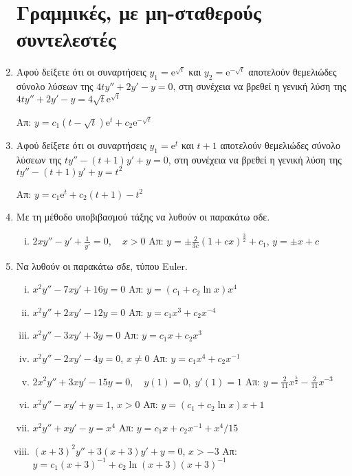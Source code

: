 \begin{enumerate}
  \section*{Γραμμικές, με μη-σταθερούς συντελεστές}

\item Αφού δείξετε ότι οι συναρτήσεις $ y_{1} = \mathrm{e}^{\sqrt{t}} $ και $ y_{2}= 
  \mathrm{e}^{- \sqrt{t}}$ αποτελούν θεμελιώδες σύνολο λύσεων της $ 4ty'' +2y'-y=0 $, 
  στη συνέχεια να βρεθεί η γενική λύση της 
  $ 4ty''+2y'-y=4 \sqrt{t} \mathrm{e}^{\sqrt{t}} $

  \hfill Απ: $ y= c_{1}(t- \sqrt{t}) \mathrm{e}^{t} + c_{2} \mathrm{e}^{- \sqrt{t}} $ 

\item Αφού δείξετε ότι οι συναρτήσεις $ y_{1} = \mathrm{e}^{t} $ και $t+1$ αποτελούν 
  θεμελιώδες σύνολο λύσεων της $ty''-(t+1)y'+y=0$, 
  στη συνέχεια να βρεθεί η γενική λύση της 
  $ ty''-(t+1)y'+y=t^{2}$

  \hfill Απ: $y= c_{1} \mathrm{e}^{t} + c_{2}(t+1) - t^{2} $ 

\item Με τη μέθοδο υποβιβασμού τάξης να λυθούν οι παρακάτω σδε.
  \begin{enumerate}[i)]
    \item $ 2xy'' - y' + \frac{1}{y'} = 0, \quad x > 0 $
      \hfill Απ: $ y= \pm \frac{2}{3c} (1+cx)^{\frac{3}{2}} + c_{1} $, \; 
      $ y= \pm x + c $ 
  \end{enumerate}

\item Να λυθούν οι παρακάτω σδε, τύπου Euler.
  \begin{enumerate}[i)]
    \item $ x^{2}y''-7xy'+16y=0 $ \hfill Απ: $ y= (c_{1}+ c_{2} \ln{x})x^{4} $ 
    \item $ x^{2}y'' + 2xy' - 12y=0 $ \hfill Απ: $ y= c_{1}x^{3} + c_{2}x^{-4} $  
    \item $ x^{2}y''-3xy'+3y=0 $ \hfill Απ: $ y=c_{1}x + c_{2}x^{3} $
    \item $ x^{2}y''-2xy'-4y=0 $,\; $ x \neq 0 $ 
      \hfill Απ: $ y=c_{1}x^{4}+ c_{2} x^{-1} $ 
    \item $ 2x^{2}y''+3xy'-15y=0, \quad y(1)=0, \; y'(1)=1 $
      \hfill Απ: $ y= \frac{2}{11} x^{\frac{5}{2}} - \frac{2}{11} x^{-3} $ 
    \item $ x^{2}y''-xy'+y=1 $,\; $ x>0 $ 
      \hfill Απ: $ y=(c_{1}+c_{2} \ln{x})x + 1 $  
    \item $ x^{2}y''+xy'-y=x^{4} $ 
      \hfill Απ: $ y=c_{1}x+c_{2}x^{-1}+ x^{4}/{15} $ 
    \item \label{eul} $ (x+3)^{2}y''+3(x+3)y'+y=0 $,\; $ x>-3 $ 
      \hfill Απ: $ y=c_{1} (x+3)^{-1} + c_{2}\ln(x+3)(x+3)^{-1} $
  \end{enumerate}

\end{enumerate}

